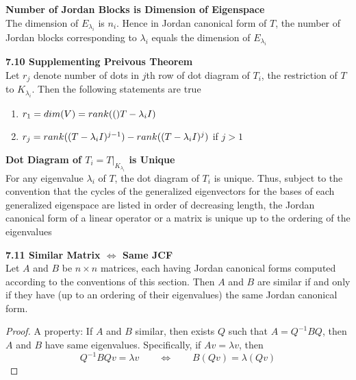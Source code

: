 \documentclass[11pt]{article}
\begin{document}
\begin{corollary*}
    \textbf{Number of Jordan Blocks is Dimension of Eigenspace} \\
    The dimension of $E_{\lambda_i}$ is $n_i$. Hence in Jordan canonical form of $T$, the number of Jordan blocks corresponding to $\lambda_i$ equals the dimension of $E_{\lambda_i}$
\end{corollary*}


\begin{theorem*}
    \textbf{7.10 Supplementing Preivous Theorem} \\
    Let $r_j$ denote number of dots in $j$th row of dot diagram of $T_i$, the restriction of $T$ to $K_{\lambda_i}$. Then the following statements are true 
    \begin{enumerate}
        \item $r_1 = dim(V) = rank(()T-\lambda_i I)$ 
        \item $r_j = rank((T-\lambda_i I)^{j-1}) - rank((T-\lambda_i I)^j)$ if $j>1$
    \end{enumerate}
\end{theorem*}

\begin{corollary*}
    \textbf{Dot Diagram of $T_i = T|_{K_{\lambda_i}}$ is Unique} \\
    For any eigenvalue $\lambda_i$ of $T$, the dot diagram of $T_i$ is unique. Thus, subject to the convention that the cycles of the generalized eigenvectors for the bases of each generalized eigenspace are listed in order of decreasing length, the Jordan canonical form of a linear operator or a matrix is unique up to the ordering of the eigenvalues
\end{corollary*}

\begin{theorem*}
    \textbf{7.11 Similar Matrix $\iff$ Same JCF} \\
    Let $A$ and $B$ be $n\times n$ matrices, each having Jordan canonical forms computed according to the conventions of this section. Then $A$ and $B$ are similar if and only if they have (up to an ordering of their eigenvalues) the same Jordan canonical form.
    \begin{proof}
        A property: If $A$ and $B$ similar, then exists $Q$ such that $A = Q^{-1}BQ$, then $A$ and $B$ have same eigenvalues. Specifically, if $Av = \lambda v$, then 
        \[
            Q^{-1}BQ v = \lambda v 
            \qquad \iff \qquad 
            B (Qv) = \lambda (Qv)
        \]
    \end{proof}
\end{theorem*}
\end{document}
